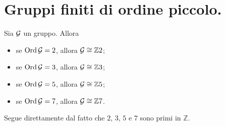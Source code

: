 \section{Gruppi finiti di ordine piccolo.}\label{GruppiPiccoli}
\begin{Theorem}
	Sia $\mathcal{G}$ un gruppo. Allora
	\begin{itemize}
		\item
		se $\operatorname{\operatorname{Ord}}{\mathcal{G}} = 2$, allora $\mathcal{G} \cong \mathbb{Z}{2}$;
		\item
		se $\operatorname{\operatorname{Ord}}{\mathcal{G}} = 3$, allora $\mathcal{G} \cong \mathbb{Z}{3}$;
		\item
		se $\operatorname{\operatorname{Ord}}{\mathcal{G}} = 5$, allora $\mathcal{G} \cong \mathbb{Z}{5}$;
		\item
		se $\operatorname{\operatorname{Ord}}{\mathcal{G}} = 7$, allora $\mathcal{G} \cong \mathbb{Z}{7}$.
	\end{itemize}
\end{Theorem}
\Proof
Segue direttamente dal fatto che $2$, $3$, $5$ e $7$ sono primi in $\mathbb{Z}$.
\EndProof
